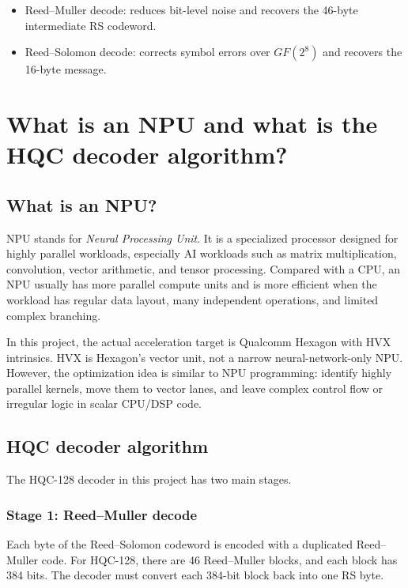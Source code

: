 \documentclass[12pt,a4paper]{article}
\begin{document}
\begin{itemize}
    \item Reed--Muller decode: reduces bit-level noise and recovers the 46-byte intermediate RS codeword.
    \item Reed--Solomon decode: corrects symbol errors over $GF(2^8)$ and recovers the 16-byte message.
\end{itemize}

\section{What is an NPU and what is the HQC decoder algorithm?}

\subsection{What is an NPU?}

NPU stands for \textit{Neural Processing Unit}. It is a specialized processor designed for highly parallel workloads, especially AI workloads such as matrix multiplication, convolution, vector arithmetic, and tensor processing. Compared with a CPU, an NPU usually has more parallel compute units and is more efficient when the workload has regular data layout, many independent operations, and limited complex branching.

In this project, the actual acceleration target is Qualcomm Hexagon with HVX intrinsics. HVX is Hexagon's vector unit, not a narrow neural-network-only NPU. However, the optimization idea is similar to NPU programming: identify highly parallel kernels, move them to vector lanes, and leave complex control flow or irregular logic in scalar CPU/DSP code.

\subsection{HQC decoder algorithm}

The HQC-128 decoder in this project has two main stages.

\subsubsection*{Stage 1: Reed--Muller decode}

Each byte of the Reed--Solomon codeword is encoded with a duplicated Reed--Muller code. For HQC-128, there are 46 Reed--Muller blocks, and each block has 384 bits. The decoder must convert each 384-bit block back into one RS byte.
\end{document}
